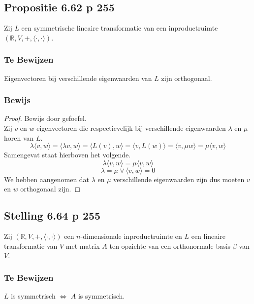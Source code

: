 \documentclass[lineaire_algebra_oplossingen.tex]{subfiles}
\begin{document}
\subsection{Propositie 6.62 p 255}
Zij $L$ een symmetrische lineaire transformatie van een inproductruimte $(\mathbb{R},V,+,\langle \cdot,\cdot \rangle)$.
\subsubsection*{Te Bewijzen}
Eigenvectoren bij verschillende eigenwaarden van $L$ zijn orthogonaal.
\subsubsection*{Bewijs}
\begin{proof}
Bewijs door gefoefel.\\
Zij $v$ en $w$ eigenvectoren die respectievelijk bij verschillende eigenwaarden $\lambda$ en $\mu$ horen van $L$.
\[
\lambda \langle v,w \rangle = \langle \lambda v,w \rangle = \langle L(v),w \rangle = \langle v,L(w) \rangle = \langle v,\mu w \rangle = \mu \langle v,w \rangle
\]
Samengevat staat hierboven het volgende.
\[
\lambda \langle v,w \rangle =\mu \langle v,w \rangle
\]
\[
\lambda = \mu \vee \langle v,w \rangle = 0
\]
We hebben aangenomen dat $\lambda$ en $\mu$ verschillende eigenwaarden zijn dus moeten $v$ en $w$ orthogonaal zijn.
\end{proof}

\subsection{Stelling 6.64 p 255}
Zij $(\mathbb{R},V,+,\langle \cdot,\cdot \rangle)$ een $n$-dimensionale inproductruimte en $L$ een lineaire transformatie van $V$ met matrix $A$ ten opzichte van een orthonormale basis $\beta$ van $V$.

\subsubsection*{Te Bewijzen}
\begin{center}
$L$ is symmetrisch $\Leftrightarrow$ $A$ is symmetrisch.
\end{center}
\end{document}
